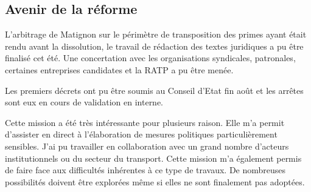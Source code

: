 \subsection{Avenir de la réforme}

L'arbitrage de Matignon sur le périmètre de transposition des primes ayant était rendu avant la dissolution, le travail de rédaction des textes juridiques a pu être finalisé cet été.
Une concertation avec les organisations syndicales, patronales, certaines entreprises candidates et la RATP a pu être menée.

Les premiers décrets ont pu être soumis au Conseil d'Etat fin août et les arrêtes sont eux en cours de validation en interne.

Cette mission a été très intéressante pour plusieurs raison. Elle m'a permit d'assister en direct à l'élaboration de mesures politiques particulièrement sensibles. J'ai pu travailler en collaboration avec un grand nombre d'acteurs institutionnels ou du secteur du transport. Cette mission m'a également permis de faire face aux difficultés inhérentes à ce type de travaux. De nombreuses possibilités doivent être explorées même si elles ne sont finalement pas adoptées. 






